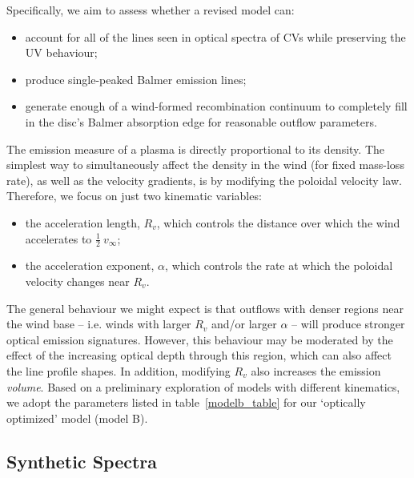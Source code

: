 Specifically, we aim to assess whether a revised model can:

\begin{itemize}
         \item account for all of the lines seen in optical spectra 
         of CVs while preserving
the UV behaviour;
         \item produce single-peaked Balmer emission lines; 
         \item generate enough of a wind-formed recombination continuum
to completely fill in the disc's Balmer absorption edge for 
reasonable outflow parameters.
\end{itemize} 

The emission measure of a plasma is directly proportional to its density.
The simplest way to simultaneously affect the density in the wind (for fixed mass-loss rate),
as well as the velocity gradients, is by modifying the poloidal velocity
law. Therefore, we focus on just two kinematic variables:

\begin{itemize}
         \item the acceleration length, $R_v$, which controls the
        distance over which the wind accelerates to $\frac{1}{2}~v_{\infty}$;
         \item the acceleration exponent, $\alpha$, which controls the rate 
         at which the poloidal velocity changes near $R_v$.
\end{itemize} 

The general behaviour we might expect is that outflows with denser
regions near the wind base -- i.e. winds with larger $R_{v}$ and/or
larger $\alpha$ -- will produce stronger optical emission signatures. 
However, this behaviour may be moderated by the effect of the increasing
optical depth through this region, which can also affect the line profile shapes. 
In addition, modifying $R_v$ also increases the emission {\em volume}.
Based on a preliminary exploration of models with different kinematics,
we adopt the parameters listed in table~\ref{modelb_table}
for our `optically optimized' model (model B). 




\subsection{Synthetic Spectra}

